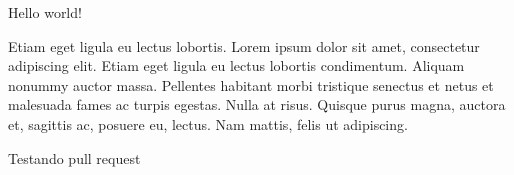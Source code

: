 \documentclass[11pt,a4paper,oneside]{article}
\begin{document}
Hello world!


Etiam eget ligula eu lectus lobortis. Lorem ipsum dolor sit amet, consectetur adipiscing elit. Etiam eget ligula eu lectus lobortis condimentum. Aliquam nonummy auctor massa. Pellentes habitant morbi tristique senectus et netus et malesuada fames ac turpis egestas. Nulla at risus. Quisque purus magna, auctora et, sagittis ac, posuere eu, lectus. Nam mattis, felis ut adipiscing.

Testando pull request
\end{document}
